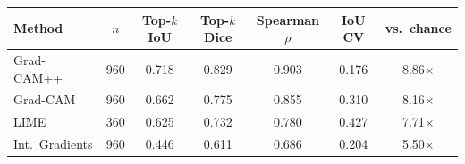 \begin{tabular}{lc ccc cc}
\toprule
\textbf{Method} & \textbf{$n$} & \textbf{Top-$k$ IoU} & \textbf{Top-$k$ Dice} & \textbf{Spearman $\rho$} & \textbf{IoU CV} & \textbf{vs.\ chance} \\
\midrule
Grad-CAM++ & 960 & 0.718 & 0.829 & 0.903 & 0.176 & 8.86$\times$ \\
Grad-CAM & 960 & 0.662 & 0.775 & 0.855 & 0.310 & 8.16$\times$ \\
LIME & 360 & 0.625 & 0.732 & 0.780 & 0.427 & 7.71$\times$ \\
Int.\ Gradients & 960 & 0.446 & 0.611 & 0.686 & 0.204 & 5.50$\times$ \\
\bottomrule
\end{tabular}
